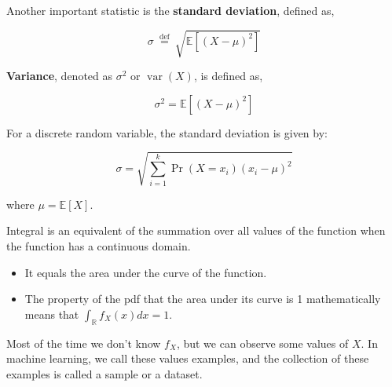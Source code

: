 \documentclass[9pt,dvipsnames]{beamer}
\begin{document}
\begin{frame}
	Another important statistic is the \textbf{standard deviation}, defined as,

	$$
		\sigma \stackrel{\text { def }}{=} \sqrt{\mathbb{E}\left[(X-\mu)^{2}\right]}
	$$

	\textbf{Variance}, denoted as $\sigma^{2}$ or $\operatorname{var}(X)$, is defined as,

	$$
		\sigma^{2}=\mathbb{E}\left[(X-\mu)^{2}\right]
	$$

	For a discrete random variable, the standard deviation is given by:

	\[
		\sigma = \sqrt{\sum_{i=1}^{k} \operatorname{Pr}(X=x_i) (x_i - \mu)^2}
	\]


	where $\mu=\mathbb{E}[X]$.
\end{frame}

\begin{frame}
Integral is an equivalent of the summation over all values of the function when the function has a continuous domain.
\begin{itemize}
	\item  It equals the area under the curve of the function.
	\item  The property of the pdf that the area under its curve is 1 mathematically means that $\int_{\mathbb{R}} f_{X}(x) d x=1$.
\end{itemize}
Most of the time we don't know $f_{X}$, but we can observe some values of $X$. In machine learning, we call these values examples, and the collection of these examples is called a sample or a dataset.
\end{frame}
\end{document}
